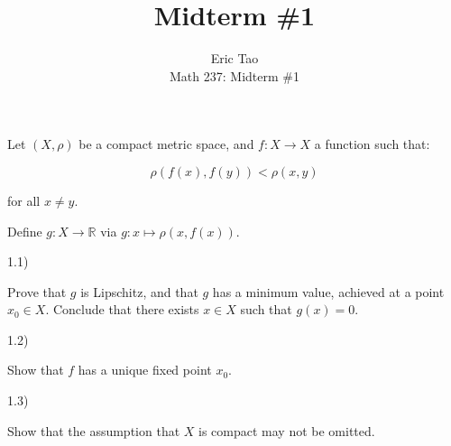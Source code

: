 \documentclass[10pt]{article}
\newenvironment{problem}[2][]{\begin{trivlist}
\item[\hskip \labelsep {\bfseries #1}\hskip \labelsep {\bfseries #2.}]}{\end{trivlist}}
\begin{document}
 
\title{Midterm \#1}
\author{Eric Tao\\
Math 237: Midterm \#1}
\maketitle

\begin{problem}{Question 1}

Let $(X, \rho)$ be a compact metric space, and $f: X \to X$ a function such that:

$$ \rho(f(x), f(y)) < \rho(x,y) $$

for all $x \not = y$.

Define $g: X \to \mathbb{R}$ via $g: x \mapsto \rho(x, f(x))$.

1.1)

Prove that $g$ is Lipschitz, and that $g$ has a minimum value, achieved at a point $x_0 \in X$. Conclude that there exists $x \in X$ such that $g(x) = 0$.

1.2)

Show that $f$ has a unique fixed point $x_0$.

1.3)

Show that the assumption that $X$ is compact may not be omitted.

\end{problem}
\end{document}
